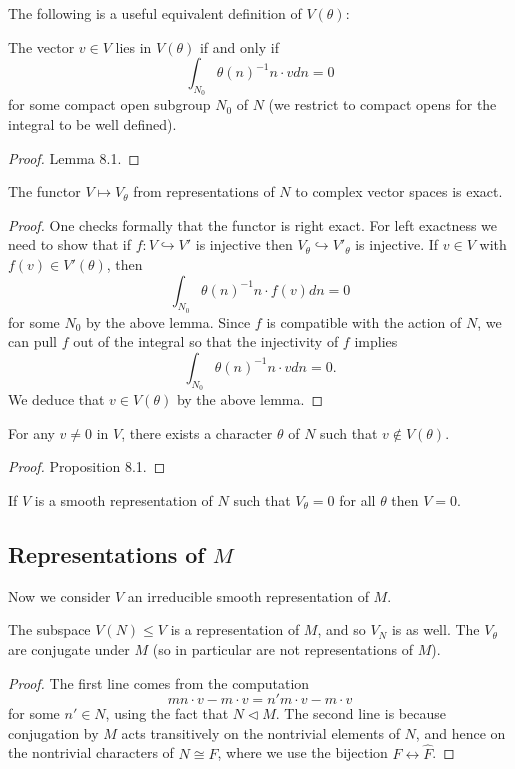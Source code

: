 The following is a useful equivalent definition of $V(\theta)$:

\begin{lemma}\label{criteria N}
    The vector $v \in V$ lies in $V(\theta)$ if and only if 
    $$\int_{N_0} \theta(n)^{-1}  n \cdot v dn = 0$$
    for some compact open subgroup $N_0$ of $N$ (we restrict to compact opens for the integral to be well defined).
\end{lemma}
\begin{proof}
    \cite{BH1} Lemma 8.1.
\end{proof}

\begin{cor}
    The functor $V \mapsto V_\theta$ from representations of $N$ to complex vector spaces is exact.
\end{cor}
\begin{proof}
    One checks formally that the functor is right exact. For left exactness we need to show that if $f: V \hookrightarrow V'$ is injective then $V_\theta \hookrightarrow V'_\theta$ is injective. If $v \in V$ with $f(v) \in V'(\theta)$, then 
    $$\int_{N_0} \theta(n)^{-1}n \cdot f(v) dn = 0$$
    for some $N_0$ by the above lemma. Since $f$ is compatible with the action of $N$, we can pull $f$ out of the integral so that the injectivity of $f$ implies
    $$\int_{N_0} \theta(n)^{-1}n \cdot v dn = 0.$$
    We deduce that $v \in V(\theta)$ by the above lemma.
\end{proof}

\begin{prop}
    For any $v \neq 0$ in $V$, there exists a character $\theta$ of $N$ such that $v \not\in V(\theta)$.
\end{prop}
\begin{proof}
    \cite{BH1} Proposition 8.1.
\end{proof}

\begin{cor}\label{character}
    If $V$ is a smooth representation of $N$ such that $V_\theta=0$ for all $\theta$ then $V=0$.
\end{cor}


\subsection{Representations of $M$}

Now we consider $V$ an irreducible smooth representation of $M$. 

\begin{lemma}
    The subspace $V(N) \leq V$ is a representation of $M$, and so $V_N$ is as well. The $V_\theta$ are conjugate under $M$ (so in particular are not representations of $M$). 
\end{lemma}
\begin{proof}
    The first line comes from the computation 
    $$mn\cdot v - m\cdot v = n'm\cdot v - m\cdot v$$ for some $n' \in N$, using the fact that $N \lhd M$. The second line is because conjugation by $M$ acts transitively on the nontrivial elements of $N$, and hence on the nontrivial characters of $N \cong F$, where we use the bijection $F \leftrightarrow \hat{F}$.
\end{proof}

